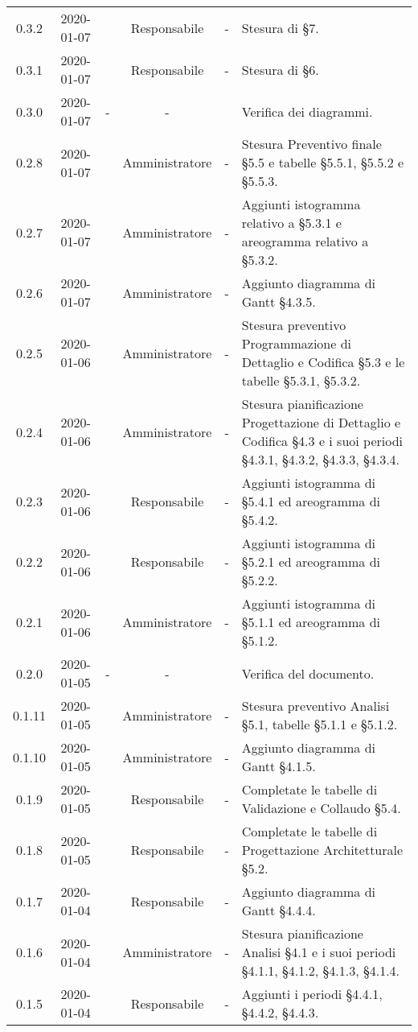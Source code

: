 {\begin{longtable}{ c c  C{2.3cm} c C{3cm} C{3.2cm}}
0.3.2 & 2020-01-07 & \SE{} & Responsabile & - & Stesura di §7. \\
0.3.1 & 2020-01-07 & \SE{} & Responsabile & - & Stesura di §6. \\
0.3.0 & 2020-01-07 & - & - & \MC{} & Verifica dei diagrammi. \\
0.2.8 & 2020-01-07 & \LD{} & Amministratore & - & Stesura Preventivo finale §5.5 e tabelle §5.5.1, §5.5.2 e §5.5.3. \\
0.2.7 & 2020-01-07 & \LD{} & Amministratore & - & Aggiunti istogramma relativo a §5.3.1 e areogramma relativo a §5.3.2. \\
0.2.6 & 2020-01-07 & \LD{} & Amministratore & - & Aggiunto diagramma di Gantt §4.3.5. \\
0.2.5 & 2020-01-06 & \LD{} & Amministratore & - & Stesura preventivo Programmazione di Dettaglio e Codifica §5.3 e le tabelle §5.3.1, §5.3.2. \\
0.2.4 & 2020-01-06 & \LD{} & Amministratore & - & Stesura pianificazione Progettazione di Dettaglio e Codifica §4.3 e i suoi periodi §4.3.1, §4.3.2, §4.3.3, §4.3.4. \\
0.2.3 & 2020-01-06 & \SE{} & Responsabile & - & Aggiunti istogramma di §5.4.1 ed areogramma di §5.4.2. \\
0.2.2 & 2020-01-06 & \SE{} & Responsabile & - & Aggiunti istogramma di §5.2.1 ed areogramma di §5.2.2. \\
0.2.1 & 2020-01-06 & \LD{} & Amministratore & - & Aggiunti istogramma di §5.1.1 ed areogramma di §5.1.2. \\
0.2.0 & 2020-01-05 & - & - & \MC{} & Verifica del documento. \\
0.1.11 & 2020-01-05 & \LD{} & Amministratore & - & Stesura preventivo Analisi §5.1, tabelle §5.1.1 e §5.1.2. \\
0.1.10 & 2020-01-05 & \LD{} & Amministratore & - & Aggiunto diagramma di Gantt §4.1.5. \\
0.1.9 & 2020-01-05 & \SE{} & Responsabile & - & Completate le tabelle di Validazione e Collaudo §5.4.\\
0.1.8 & 2020-01-05 & \SE{} & Responsabile & - & Completate le tabelle di Progettazione Architetturale §5.2. \\
0.1.7 & 2020-01-04 & \SE{} & Responsabile & - & Aggiunto diagramma di Gantt §4.4.4. \\
0.1.6 & 2020-01-04 & \LD{} & Amministratore & - & Stesura pianificazione Analisi §4.1 e i suoi periodi §4.1.1, §4.1.2, §4.1.3, §4.1.4. \\
0.1.5 & 2020-01-04 & \SE{} & Responsabile & - & Aggiunti i periodi §4.4.1, §4.4.2, §4.4.3. \\

\end{longtable}}
